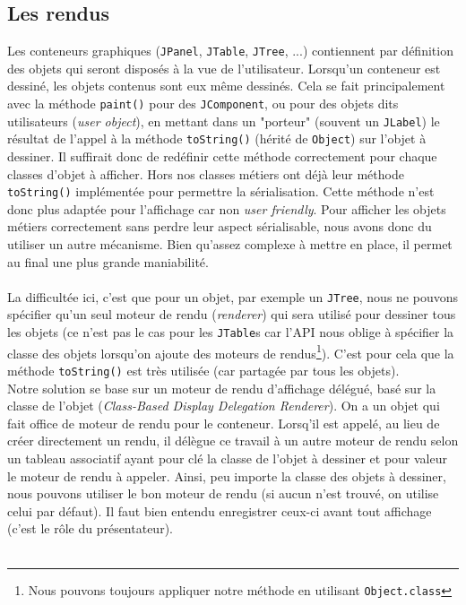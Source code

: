 \documentclass{article}
\begin{document}
\subsection{Les rendus}
Les conteneurs graphiques (\texttt{JPanel}, \texttt{JTable}, \texttt{JTree}, ...) contiennent par définition des objets qui seront disposés à la vue de l'utilisateur. Lorsqu'un conteneur est dessiné, les objets contenus sont eux même dessinés. Cela se fait principalement avec la méthode \texttt{paint()} pour des \texttt{JComponent}, ou pour des objets dits utilisateurs (\textit{user object}), en mettant dans un "porteur" (souvent un \texttt{JLabel}) le résultat de l'appel à la méthode \texttt{toString()} (hérité de \texttt{Object}) sur l'objet à dessiner. Il suffirait donc de redéfinir cette méthode correctement pour chaque classes d'objet à afficher. Hors nos classes métiers ont déjà leur méthode \texttt{toString()} implémentée pour permettre la sérialisation. Cette méthode n'est donc plus adaptée pour l'affichage car non \textit{user friendly}. Pour afficher les objets métiers correctement sans perdre leur aspect sérialisable, nous avons donc du utiliser un autre mécanisme. Bien qu'assez complexe à mettre en place, il permet au final une plus grande maniabilité.\\ \\
La difficultée ici, c'est que pour un objet, par exemple un \texttt{JTree}, nous ne pouvons spécifier qu'un seul moteur de rendu (\textit{renderer}) qui sera utilisé pour dessiner tous les objets (ce n'est pas le cas pour les \texttt{JTable}s car l'API nous oblige à spécifier la classe des objets lorsqu'on ajoute des moteurs de rendus\footnote{Nous pouvons toujours appliquer notre méthode en utilisant \texttt{Object.class}}). C'est pour cela que la méthode \texttt{toString()} est très utilisée (car partagée par tous les objets).\\
Notre solution se base sur un moteur de rendu d'affichage délégué, basé sur la classe de l'objet (\textit{Class-Based Display Delegation Renderer}). On a un objet qui fait office de moteur de rendu pour le conteneur. Lorsq'il est appelé, au lieu de créer directement un rendu, il délègue ce travail à un autre moteur de rendu selon un tableau associatif ayant pour clé la classe de l'objet à dessiner et pour valeur le moteur de rendu à appeler. Ainsi, peu importe la classe des objets à dessiner, nous pouvons utiliser le bon moteur de rendu (si aucun n'est trouvé, on utilise celui par défaut). Il faut bien entendu enregistrer ceux-ci avant tout affichage (c'est le rôle du présentateur).\\ \\
\end{document}
